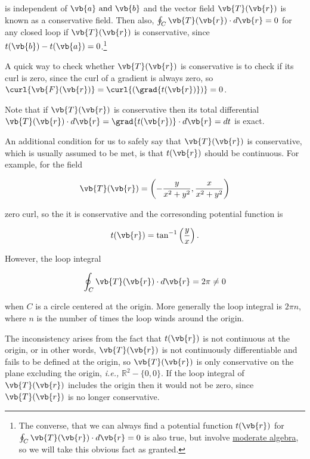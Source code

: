 \documentclass[english,a4paper,12pt]{report}
\begin{document}
is independent of \(\vb{a} \text { and } \vb{b} \) and the vector field \(\vb{T} (\vb{r} )\) is known as a conservative field. Then also, \(\oint_{C} \vb{T} (\vb{r} ) \cdot d\vb{r} = 0\) for any closed loop if \(\vb{T} (\vb{r} )\) is conservative, since \(t(\vb{b}) - t(\vb{a}) = 0\).\footnote{The converse, that we can always find a potential function \(t(\vb{r} )\) for \(\oint_{C}\vb{T} (\vb{r} )\cdot d\vb{r}  =0\) is also true, but involve \href{https:////www.damtp.cam.ac.uk//user//tong//vc//vc.pdf}{moderate algebra}, so we will take this obvious fact as granted.  } 

A quick way to check whether \(\vb{T} (\vb{r} )\) is conservative is to check if its curl is zero, since the curl of a gradient is always zero, so \(\curl{\vb{F} (\vb{r} )} = \curl{(\grad{t(\vb{r} )} )} =0 \).

Note that if \(\vb{T} (\vb{r} )\) is conservative then its total differential \(\vb{T} (\vb{r} ) \cdot d\vb{r} = \grad{t(\vb{r} )} \cdot d\vb{r} = dt \) is exact.  

An additional condition for us to safely say that \(\vb{T} (\vb{r} )\) is conservative, which is usually assumed to be met, is that \(t(\vb{r} )\) should be continuous. For example, for the field

\begin{equation}
	\vb{T} (\vb{r} ) = \left( -\frac{y}{x^2+y^2}, \frac{x}{x^2+y^2}   \right)
\end{equation}

zero curl, so the it is conservative and the corresonding potential function is 

\begin{equation}
	t(\vb{r} ) = \tan ^{-1} \left( \frac{y}{x}  \right).
\end{equation}

However, the loop integral 

\begin{equation}
	\oint_{C} \vb{T} (\vb{r} ) \cdot d\vb{r} = 2\pi \neq 0
\end{equation}

when \(C\) is a circle centered at the origin. More generally the loop integral is \(2\pi n\), where \(n\) is the number of times the loop winds around the origin. 

The inconsistency arises from the fact that \(t(\vb{r} )\) is not continuous at the origin, or in other words, \(\vb{T} (\vb{r} )\) is not continuously differentiable and fails to be defined at the origin, so \(\vb{T} (\vb{r} )\) is only conservative on the plane excluding the origin, \textit{i.e.,} \(\mathbb{R}^2 - \{0,0\}\). If the loop integral of \(\vb{T} (\vb{r} )\) includes the origin then it would not be zero, since \(\vb{T} (\vb{r} )\) is no longer conservative. 
\end{document}
